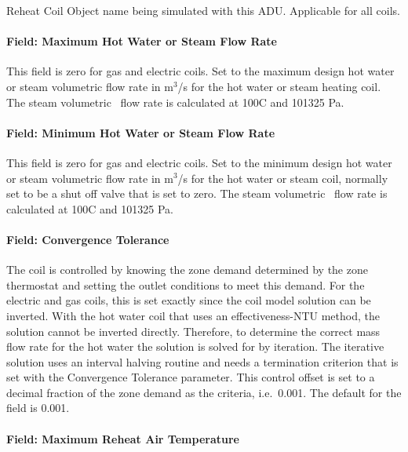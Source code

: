 Reheat Coil Object name being simulated with this ADU. Applicable for all coils.

\paragraph{Field: Maximum Hot Water or Steam Flow Rate}\label{field-maximum-hot-water-or-steam-flow-rate}

This field is zero for gas and electric coils. Set to the maximum design hot water or steam volumetric flow rate in m\(^{3}\)/s for the hot water or steam heating coil. The steam volumetric~ flow rate is calculated at 100C and 101325 Pa.

\paragraph{Field: Minimum Hot Water or Steam Flow Rate}\label{field-minimum-hot-water-or-steam-flow-rate}

This field is zero for gas and electric coils. Set to the minimum design hot water or steam volumetric flow rate in m\(^{3}\)/s for the hot water or steam coil, normally set to be a shut off valve that is set to zero. The steam volumetric~ flow rate is calculated at 100C and 101325 Pa.

\paragraph{Field: Convergence Tolerance}\label{field-convergence-tolerance}

The coil is controlled by knowing the zone demand determined by the zone thermostat and setting the outlet conditions to meet this demand. For the electric and gas coils, this is set exactly since the coil model solution can be inverted. With the hot water coil that uses an effectiveness-NTU method, the solution cannot be inverted directly. Therefore, to determine the correct mass flow rate for the hot water the solution is solved for by iteration. The iterative solution uses an interval halving routine and needs a termination criterion that is set with the Convergence Tolerance parameter. This control offset is set to a decimal fraction of the zone demand as the criteria, i.e.~0.001. The default for the field is 0.001.

\paragraph{Field: Maximum Reheat Air Temperature}\label{field-maximum-reheat-air-temperature}

